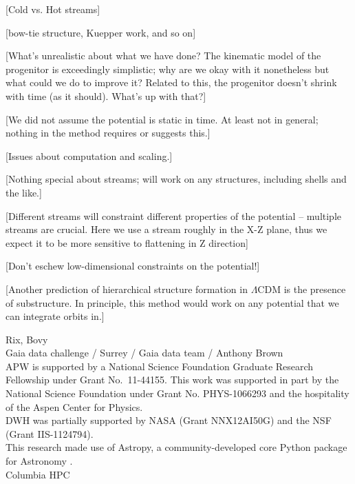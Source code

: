 \documentclass[letterpaper,12pt,preprint]{aastex}
\begin{document}
[Cold vs. Hot streams]

[bow-tie structure, Kuepper work, and so on]

[What's unrealistic about what we have done?  The kinematic model of
  the progenitor is exceedingly simplistic; why are we okay with it
  nonetheless but what could we do to improve it?  Related to this,
  the progenitor doesn't shrink with time (as it should).  What's up
  with that?]

[We did not assume the potential is static in time.  At least not in
  general; nothing in the method requires or suggests this.]

[Issues about computation and scaling.]

[Nothing special about streams; will work on any structures, including
  shells and the like.]

[Different streams will constraint different properties of the potential -- multiple streams are crucial. Here we use a stream roughly in the X-Z plane, thus we expect it to be more sensitive to flattening in Z direction]

[Don't eschew low-dimensional constraints on the potential!]

[Another prediction of hierarchical structure formation in $\Lambda$CDM is the presence of substructure. In principle, this method would work on any potential that we can integrate orbits in.]

\acknowledgements
Rix, Bovy\\
Gaia data challenge / Surrey / Gaia data team / Anthony Brown \\ %
APW is supported by a National Science Foundation Graduate Research
Fellowship under Grant No.\ 11-44155. This work was supported in part by 
the National Science Foundation under Grant No. PHYS-1066293 and the 
hospitality of the Aspen Center for Physics.\\
DWH was partially supported by NASA (Grant NNX12AI50G) and the NSF (Grant IIS-1124794).\\
This research made use of Astropy, a community-developed core Python package for Astronomy \citep{astropy13}. \\
Columbia HPC\\



\end{document}
